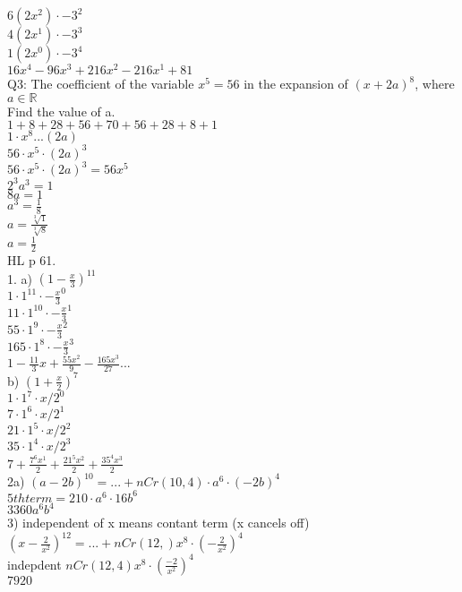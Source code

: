 \documentclass{article}
\begin{document}
  $6(2x^2)\cdot-3^2$\\
  $4(2x^1)\cdot-3^3$\\
  $1(2x^0)\cdot-3^4$\\
  $16x^4-96x^3+216x^2-216x^1+81$\\
  Q3: The coefficient of the variable $x^5=56$ in the expansion of $(x+2a)^8$, where $a\in \mathbb{R}$\\
  Find the value of a.\\
  $1+ 8+ 28+ 56 + 70 + 56 + 28 + 8 + 1$\\
  $1\cdot x^8...(2a)$\\
  $56\cdot x^5\cdot (2a)^3$\\
  $56\cdot x^5\cdot (2a)^3=56x^5$\\
  $2^3a^3=1$\\
  $8a=1$\\
  $a^3=\frac{1}{8}$\\
  $a=\frac{\sqrt[3]{1}}{\sqrt[3]{8}}$\\
  $a=\frac{1}{2}$\\
  HL p 61.\\
  1. a) $(1-\frac{x}{3})^{11}$\\
  $1\cdot 1^{11}\cdot -\frac{x}{3}^0$\\
  $11\cdot 1^{10}\cdot -\frac{x}{3}^1$\\
  $55\cdot 1^{9}\cdot -\frac{x}{3}^2$\\
  $165\cdot 1^8\cdot -\frac{x}{3}^3$\\
  $1-\frac{11}{3}x+\frac{55x^2}{9}-\frac{165x^3}{27}...$\\
  b) $(1+\frac{x}{2})^7$\\
  $1\cdot 1^7\cdot x/2^0$\\
  $7\cdot 1^6\cdot x/2^1$\\
  $21\cdot 1^5\cdot x/2^2$\\
  $35\cdot 1^4\cdot x/2^3$\\
  $7+ \frac{7^6x^1}{2}+ \frac{21^5x^2}{2}+ \frac{35^4x^3}{2}$\\
  2a) $(a-2b)^{10}=...+nCr(10,4)\cdot a^6\cdot (-2b)^4$\\
  $5th term=210\cdot a^6\cdot16b^6$\\
  $3360a^6b^4$\\
  3) independent of x means contant term (x cancels off)\\
  $(x-\frac{2}{x^2})^{12}=...+ nCr(12,)x^{8}\cdot(-\frac{2}{x^2})^{4}$\\
  indepdent $nCr(12,4)x^8\cdot (\frac{-2}{x^2})^4$\\
  $7920$

   
\end{document}
